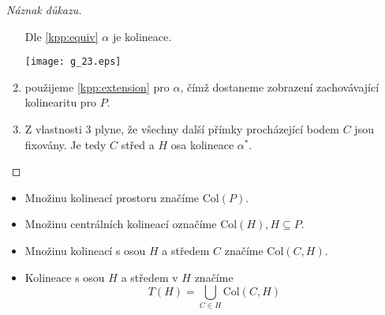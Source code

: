 \begin{proof}[Náznak důkazu]
\begin{enumerate}
		Dle \cref{kpp:equiv} $\alpha$ je kolineace.

    \texttt{[image: g\_23.eps]}

	\item použijeme \cref{kpp:extension} pro $\alpha$, čímž dostaneme zobrazení zachovávající kolinearitu pro $P$.
	\item Z vlastnosti 3 plyne, že všechny další přímky procházející bodem $C$ jsou fixovány.
		Je tedy $C$ střed a $H$ osa kolineace $\alpha^*$.
    \end{enumerate}
\end{proof}

\begin{definition}
    \begin{itemize}
	\item Množinu kolineací prostoru značíme $\mathrm{Col}(P)$.
        \item Množinu centrálních kolineací označíme $\mathrm{Col}(H), H \subseteq P$.
        \item Množinu kolineací s osou $H$ a středem $C$ značíme $\mathrm{Col}(C,H)$.
        \item Kolineace s osou $H$ a středem v $H$ značíme
		\[ T(H) = \bigcup_{C \in H} \mathrm{Col}(C,H) \]
    \end{itemize}
\end{definition}

